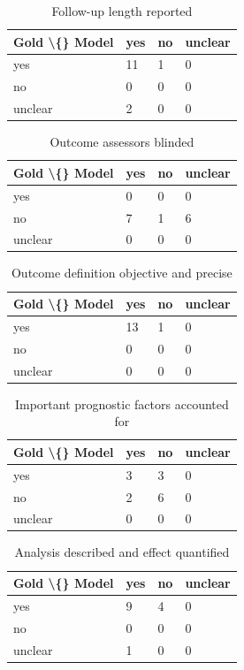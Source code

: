 \documentclass[11pt,a4paper]{article}
\begin{document}
\begin{table}[H]
\centering
\caption{Follow-up length reported}
\label{tab:supp_20}
\begin{tabular}{llll}
\toprule
Gold \textbackslash\{\} Model & yes & no & unclear \\
\midrule
yes & 11 & 1 & 0 \\
no & 0 & 0 & 0 \\
unclear & 2 & 0 & 0 \\
\bottomrule
\end{tabular}
\end{table}

\begin{table}[H]
\centering
\caption{Outcome assessors blinded}
\label{tab:supp_21}
\begin{tabular}{llll}
\toprule
Gold \textbackslash\{\} Model & yes & no & unclear \\
\midrule
yes & 0 & 0 & 0 \\
no & 7 & 1 & 6 \\
unclear & 0 & 0 & 0 \\
\bottomrule
\end{tabular}
\end{table}

\begin{table}[H]
\centering
\caption{Outcome definition objective and precise}
\label{tab:supp_22}
\begin{tabular}{llll}
\toprule
Gold \textbackslash\{\} Model & yes & no & unclear \\
\midrule
yes & 13 & 1 & 0 \\
no & 0 & 0 & 0 \\
unclear & 0 & 0 & 0 \\
\bottomrule
\end{tabular}
\end{table}

\begin{table}[H]
\centering
\caption{Important prognostic factors accounted for}
\label{tab:supp_23}
\begin{tabular}{llll}
\toprule
Gold \textbackslash\{\} Model & yes & no & unclear \\
\midrule
yes & 3 & 3 & 0 \\
no & 2 & 6 & 0 \\
unclear & 0 & 0 & 0 \\
\bottomrule
\end{tabular}
\end{table}

\begin{table}[H]
\centering
\caption{Analysis described and effect quantified}
\label{tab:supp_24}
\begin{tabular}{llll}
\toprule
Gold \textbackslash\{\} Model & yes & no & unclear \\
\midrule
yes & 9 & 4 & 0 \\
no & 0 & 0 & 0 \\
unclear & 1 & 0 & 0 \\
\bottomrule
\end{tabular}
\end{table}
\end{document}

